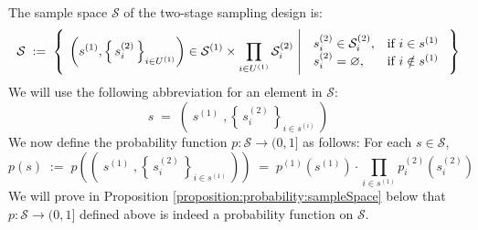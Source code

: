 \documentclass{article}
\begin{document}
\vskip 0.3cm
\noindent
The sample space $\mathcal{S}$ of the two-stage sampling design is:
\begin{equation*}
\mathcal{S}
\;:=\;
\left\{\;
\left.\left(s^{(1)},\left\{\,s^{(2)}_{i}\,\right\}_{i\in U^{(1)}}\right) \in \mathcal{S}^{(1)} \times \prod_{i \in U^{(1)}}\mathcal{S}^{(2)}_{i}\;\right\vert\;
\begin{array}{ll}
s^{(2)}_{i} \in \mathcal{S}^{(2)}_{i}, &\textnormal{if $i \in s^{(1)}$}
\\
s^{(2)}_{i} = \varnothing, & \textnormal{if $i \notin s^{(1)}$}
\end{array}
\;\right\}
\end{equation*}
We will use the following abbreviation for an element in $\mathcal{S}$:
\begin{equation*}
s \;=\; \left(\;s^{(1)}\;,\left\{\,s^{(2)}_{i}\,\right\}_{i \in s^{(i)}}\,\right)
\end{equation*}
We now define the probability function $p : \mathcal{S} \longrightarrow (0,1]$ as follows:
For each $s \in \mathcal{S}$,
\begin{equation*}
p(s)
\;:=\; p\left(\left(\;s^{(1)}\;,\left\{\,s^{(2)}_{i}\,\right\}_{i \in s^{(1)}}\,\right)\right)
\;=\; p^{(1)}\!\left(s^{(1)}\right)\cdot\prod_{i\in s^{(1)}}p^{(2)}_{i}\!\left(s^{(2)}_{i}\right)
\end{equation*}
We will prove in Proposition \ref{proposition:probability:sampleSpace} below that
$p : \mathcal{S} \longrightarrow (0,1]$ defined above is indeed a probability function on $\mathcal{S}$.
\end{document}
